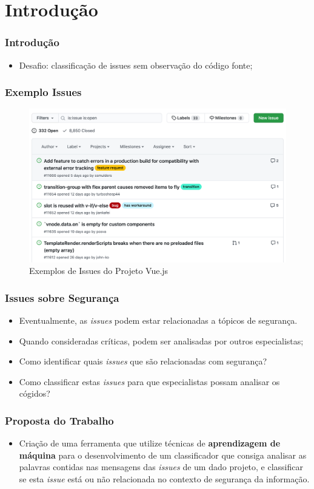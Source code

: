 \section[Introdução]{Introdução}

\begin{frame}
  \frametitle{Introdução}
  \begin{itemize}
    \item Desafio: classificação de issues sem observação do código fonte;
  \end{itemize}
\end{frame}

\begin{frame}
  \frametitle{Exemplo Issues}
  \begin{figure}[htbp]
    \includegraphics[width=\textwidth]{../report/images/issues_example.png}
    \caption{Exemplos de Issues do Projeto Vue.js}
  \end{figure}
\end{frame}

\begin{frame}
  \frametitle{Issues sobre Segurança}
  \begin{itemize}
    \item Eventualmente, as \textit{issues} podem estar relacionadas a tópicos de segurança.
    \item Quando consideradas críticas, podem ser analisadas por outros especialistas;
    \item Como identificar quais \textit{issues} que são relacionadas com segurança?
    \item Como classificar estas \textit{issues} para que especialistas possam analisar os cógidos?
  \end{itemize}
\end{frame}

\begin{frame}
  \frametitle{Proposta do Trabalho}
  \begin{itemize}
    \item Criação de uma ferramenta que utilize técnicas de \textbf{aprendizagem de máquina} para o desenvolvimento de um classificador que consiga analisar as palavras contidas nas mensagens das \textit{issues} de um dado projeto, e classificar se esta \textit{issue} está ou não relacionada no contexto de segurança da informação.
  \end{itemize}
\end{frame}